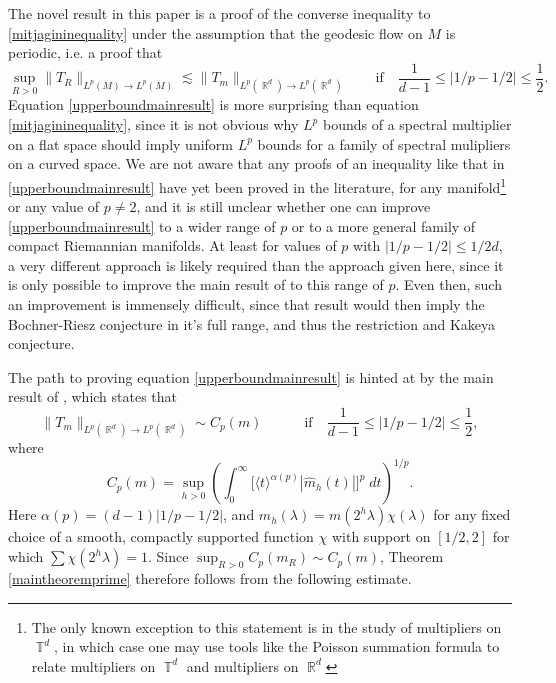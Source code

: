 \documentclass[dvipsnames,letterpaper,12pt]{article}
\DeclareMathOperator{\RR}{\mathbb{R}}
\DeclareMathOperator{\TT}{\mathbb{T}}
\begin{document}
The novel result in this paper is a proof of the converse inequality to \eqref{mitjagininequality} under the assumption that the geodesic flow on $M$ is periodic, i.e. a proof that
%
\begin{equation} \label{upperboundmainresult}
    \sup_{R>0} \| T_R \|_{L^p(M) \to L^p(M)} \lesssim \| T_m \|_{L^p(\RR^d) \to L^p(\RR^d)} \quad\quad \text{if}\quad \frac{1}{d-1} \leq |1/p - 1/2| \leq \frac{1}{2}.
\end{equation}
%
Equation \eqref{upperboundmainresult} is more surprising than equation \eqref{mitjagininequality}, since it is not obvious why $L^p$ bounds of a spectral multiplier on a flat space should imply uniform $L^p$ bounds for a family of spectral mulipliers on a curved space. We are not aware that any proofs of an inequality like that in \eqref{upperboundmainresult} have yet been proved in the literature, for any manifold\footnote{The only known exception to this statement is in the study of multipliers on $\TT^d$, in which case one may use tools like the Poisson summation formula to relate multipliers on $\TT^d$ and multipliers on $\RR^d$} or any value of $p \neq 2$, and it is still unclear whether one can improve \eqref{upperboundmainresult} to a wider range of $p$ or to a more general family of compact Riemannian manifolds. At least for values of $p$ with $|1/p - 1/2| \leq 1/2d$, a very different approach is likely required than the approach given here, since it is only possible to improve the main result of \cite{HeoandNazarovandSeeger} to this range of $p$. Even then, such an improvement is immensely difficult, since that result would then imply the Bochner-Riesz conjecture in it's full range, and thus the restriction and Kakeya conjecture.

The path to proving equation \eqref{upperboundmainresult} is hinted at by the main result of \cite{HeoandNazarovandSeeger}, which states that
%
\begin{equation} \label{heonazarovestimate}
    \| T_m \|_{L^p(\RR^d) \to L^p(\RR^d)} \sim C_p(m)\quad\quad\quad \text{if}\quad \frac{1}{d-1} \leq |1/p - 1/2| \leq \frac{1}{2},
\end{equation}
%
where
%
\[ C_p(m) = \sup_{h > 0} \left( \int_0^\infty \Big[ \langle t \rangle^{\alpha(p)} |\widehat{m}_h(t)| \Big]^p\; dt \right)^{1/p}. \]
%
Here $\alpha(p) = (d-1)|1/p - 1/2|$, and $m_h(\lambda) = m(2^h \lambda) \chi(\lambda)$ for any fixed choice of a smooth, compactly supported function $\chi$ with support on $[1/2,2]$ for which $\sum \chi(2^h \lambda) = 1$. Since $\sup_{R > 0} C_p(m_R) \sim C_p(m)$, Theorem \ref{maintheoremprime} therefore follows from the following estimate.
\end{document}
